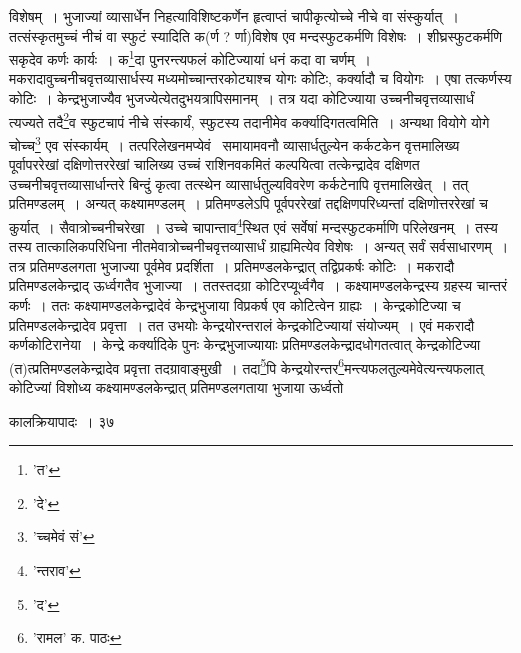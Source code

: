 \documentclass[11pt, openany]{book}
\begin{document}
{{{{\vspace{0.3cm}
\noindent विशेषम्~। भुजाज्यां व्यासार्धेन निहत्याविशिष्टकर्णेन हृत्वाप्तं चापीकृत्योच्चे नीचे वा संस्कुर्यात्~। तत्संस्कृतमुच्चं नीचं वा स्फुटं स्यादिति क(र्ण ? र्णा)विशेष एव मन्दस्फुटकर्मणि विशेषः~। शीघ्रस्फुटकर्मणि सकृदेव कर्णः कार्यः~। क\renewcommand{\thefootnote}{१}\footnote{'त'}दा पुनरन्त्यफलं कोटिज्यायां धनं कदा वा चर्णम्~। मकरादावुच्चनीचवृत्तव्यासार्धस्य मध्यमोच्चान्तरकोट्याश्च योगः कोटिः, कर्क्यादौ च वियोगः~। एषा तत्कर्णस्य कोटिः~। केन्द्रभुजाज्यैव भुजज्येत्येतदुभयत्रापिसमानम्~। तत्र यदा कोटिज्याया उच्चनीचवृत्तव्यासार्धं त्यज्यते तदै\renewcommand{\thefootnote}{२}\footnote{'दे'}व स्फुटचापं नीचे संस्कार्यं, स्फुटस्य तदानीमेव कर्क्यादिगतत्वमिति~। अन्यथा वियोगे योगे चोच्च\renewcommand{\thefootnote}{३}\footnote{'च्चमेवं सं'} एव संस्कार्यम्~। तत्परिलेखनमप्येवं \textendash\ समायामवनौ व्यासार्धतुल्येन कर्कटकेन वृत्तमालिख्य पूर्वापररेखां दक्षिणोत्तररेखां
चालिख्य उच्चं राशिनवकमितं कल्पयित्वा तत्केन्द्रादेव दक्षिणत उच्चनीचवृत्तव्यासार्धान्तरे बिन्दुं कृत्वा तत्स्थेन व्यासार्धतुल्यविवरेण
कर्कटेनापि वृत्तमालिखेत्~। तत् प्रतिमण्डलम्~। अन्यत् कक्ष्यामण्डलम्~। प्रतिमण्डलेऽपि पूर्वपररेखां तद्दक्षिणपरिध्यन्तां दक्षिणोत्तररेखां च कुर्यात्~।
सैवात्रोच्चनीचरेखा~। उच्चे चापान्ताव\renewcommand{\thefootnote}{४}\footnote{'न्तराव'}स्थित एवं सर्वेषां मन्दस्फुटकर्माणि परिलेखनम्~। तस्य तस्य तात्कालिकपरिधिना नीतमेवात्रोच्चनीचवृत्तव्यासार्धं ग्राह्यमित्येव विशेषः~। अन्यत् सर्वं सर्वसाधारणम्~। तत्र प्रतिमण्डलगता भुजाज्या पूर्वमेव प्रदर्शिता~। प्रतिमण्डलकेन्द्रात् तद्विप्रकर्षः कोटिः~। मकरादौ प्रतिमण्डलकेन्द्राद् ऊर्ध्वगतैव भुजाज्या~। ततस्तदग्रा कोटिरप्यूर्ध्वगैव~। कक्ष्यामण्डलकेन्द्रस्य ग्रहस्य चान्तरं कर्णः~। ततः कक्ष्यामण्डलकेन्द्रादेवं केन्द्रभुजाया विप्रकर्ष एव कोटित्वेन ग्राह्यः~। केन्द्रकोटिज्या च प्रतिमण्डलकेन्द्रादेव प्रवृत्ता~। तत उभयोः केन्द्रयोरन्तरालं केन्द्रकोटिज्यायां संयोज्यम्~। एवं मकरादौ कर्णकोटिरानेया~। केन्द्रे कर्क्यादिके पुनः केन्द्रभुजाज्यायाः प्रतिमण्डलकेन्द्रादधोगतत्वात् केन्द्रकोटिज्या (त)त्प्रतिमण्डलकेन्द्रादेव
प्रवृत्ता तदग्रावाङ्मुखी~। तदा\renewcommand{\thefootnote}{५}\footnote{'द'}पि
केन्द्रयोरन्तर\renewcommand{\thefootnote}{६}\footnote{'रामल' क. पाठः}मन्त्यफलतुल्यमेवेत्यन्त्यफलात् कोटिज्यां विशोध्य कक्ष्यामण्डलकेन्द्रात् प्रतिमण्डलगताया भुजाया ऊर्ध्वतो

\newpage

\vspace{3cm} \hspace{4cm}कालक्रियापादः~। \hspace{4cm}३७

}}}}
\end{document}
